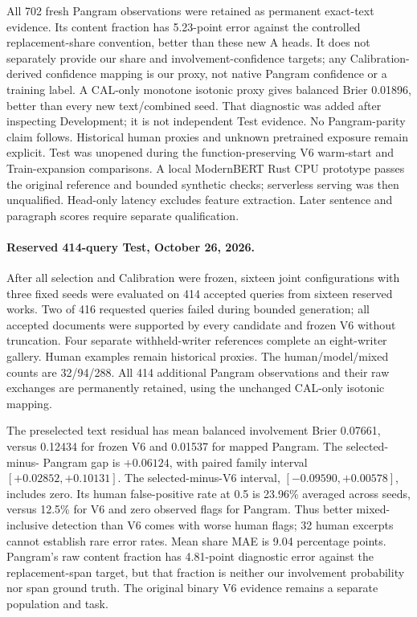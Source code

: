 All 702 fresh Pangram observations were retained as permanent exact-text evidence.
Its content fraction has 5.23-point error against the controlled replacement-share
convention, better than these new A heads. It does not separately provide our
share and involvement-confidence targets; any Calibration-derived confidence
mapping is our proxy, not native Pangram confidence or a training label. A
CAL-only monotone isotonic proxy gives balanced Brier 0.01896, better than every
new text/combined seed. That diagnostic was added after inspecting Development;
it is not independent Test evidence. No Pangram-parity claim follows.
Historical human proxies and unknown pretrained
exposure remain explicit. Test was unopened during the
function-preserving V6 warm-start and Train-expansion comparisons. A local
ModernBERT Rust CPU prototype passes the original reference and bounded synthetic
checks; serverless serving was then unqualified. Head-only latency excludes
feature extraction. Later sentence and paragraph scores require separate
qualification.

\paragraph{Reserved 414-query Test, October 26, 2026.}
After all selection and Calibration were frozen, sixteen joint configurations
with three fixed seeds were evaluated on 414 accepted queries from sixteen
reserved works. Two of 416 requested queries failed during bounded generation;
all accepted documents were supported by every candidate and frozen V6 without
truncation. Four separate withheld-writer references complete an eight-writer
gallery. Human examples remain historical proxies. The human/model/mixed counts
are 32/94/288. All 414 additional Pangram observations and their raw exchanges
are permanently retained, using the unchanged CAL-only isotonic mapping.

The preselected text residual has mean balanced involvement Brier 0.07661,
versus 0.12434 for frozen V6 and 0.01537 for mapped Pangram. The selected-minus-
Pangram gap is $+0.06124$, with paired family interval $[+0.02852,+0.10131]$.
The selected-minus-V6 interval, $[-0.09590,+0.00578]$, includes zero. Its human
false-positive rate at 0.5 is 23.96\% averaged across seeds, versus 12.5\% for
V6 and zero observed flags for Pangram. Thus better mixed-inclusive detection
than V6 comes with worse human flags; 32 human excerpts cannot establish rare
error rates. Mean share MAE is 9.04 percentage points. Pangram's raw content
fraction has 4.81-point diagnostic error against the replacement-span target,
but that fraction is neither our involvement probability nor span ground truth.
The original binary V6 evidence remains a separate population and task.

